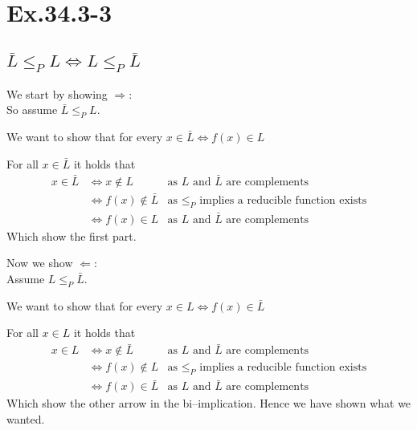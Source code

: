 \section*{Ex.34.3-3}
\subsection*{ $\bar{L}\leq_P L \Leftrightarrow L \leq_P \bar{L}$}

We start by showing $\Rightarrow$:
\\
So assume $\bar{L}\leq_P L$.

We want to show that for every $x\in \bar{L} \Leftrightarrow  f(x) \in L$

For all $x\in \bar{L}$ it holds that
\begin{align*}
x\in \bar{L} & \Leftrightarrow x \not\in L 					&\text{as $L$ and $\bar{L}$ are complements}\\
						 & \Leftrightarrow f(x) \not\in \bar{L} &\text{as $\leq_P$ implies a reducible function exists}\\
						 & \Leftrightarrow f(x) \in L 					&\text{as $L$ and $\bar{L}$ are complements}
\end{align*}
Which show the first part.

Now we show $\Leftarrow$:
\\
Assume $L \leq_P \bar{L}$.

We want to show that for every $x\in L \Leftrightarrow  f(x) \in \bar{L}$

For all $x\in L$ it holds that
\begin{align*}
x\in L       & \Leftrightarrow x \not\in \bar{L} 					&\text{as $L$ and $\bar{L}$ are complements}\\
						 & \Leftrightarrow f(x) \not\in L  &\text{as $\leq_P$ implies a reducible function exists}\\
						 & \Leftrightarrow f(x) \in \bar{L} 					&\text{as $L$ and $\bar{L}$ are complements}
\end{align*}
Which show the other arrow in the bi--implication. Hence we have shown what we wanted.